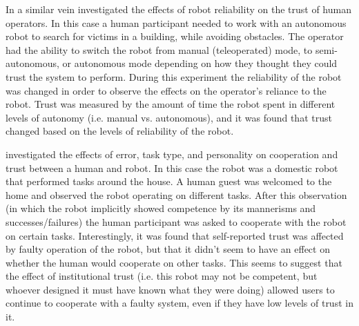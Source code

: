 In a similar vein \citet{Desai2012-rc} investigated the effects of robot reliability on the trust of human operators. In this case a human participant needed to work with an autonomous robot to search for victims in a building, while avoiding obstacles. The operator had the ability to switch the robot from manual (teleoperated) mode, to semi-autonomous, or autonomous mode depending on how they thought they could trust the system to perform. During this experiment the reliability of the robot was changed in order to observe the effects on the operator's reliance to the robot. Trust was measured by the amount of time the robot spent in different levels of autonomy (i.e. manual vs. autonomous), and it was found that trust changed based on the levels of reliability of the robot.

\citet{Salem2015-md} investigated the effects of error, task type, and personality on cooperation and trust between a human and robot. In this case the robot was a domestic robot that performed tasks around the house. A human guest was welcomed to the home and observed the robot operating on different tasks. After this observation (in which the robot implicitly showed competence by its mannerisms and successes/failures) the human participant was asked to cooperate with the robot on certain tasks. Interestingly, it was found that self-reported trust was affected by faulty operation of the robot, but that it didn't seem to have an effect on whether the human would cooperate on other tasks. This seems to suggest that the effect of institutional trust (i.e. this robot may not be competent, but whoever designed it must have known what they were doing) allowed users to continue to cooperate with a faulty system, even if they have low levels of trust in it.

